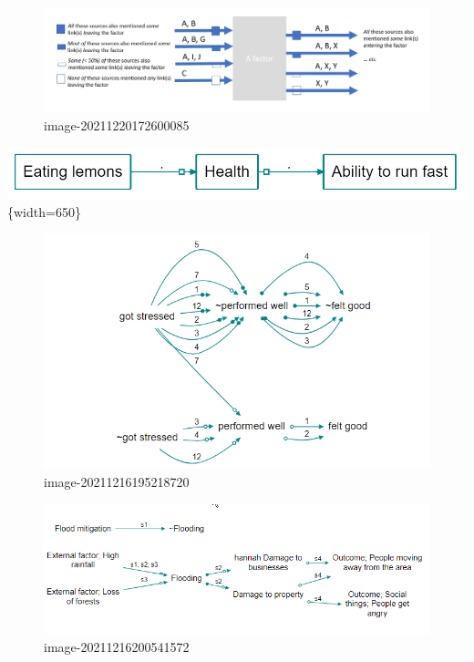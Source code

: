\documentclass[
]{book}
\begin{document}
\begin{figure}
\centering
\includegraphics[width=6.77083in,height=\textheight]{_assets/image-20211220172600085.png}
\caption{image-20211220172600085}
\end{figure}

\includegraphics[width=6.77083in,height=\textheight]{_assets/image-20211220171759409.png}\{width=650\}

\begin{figure}
\centering
\includegraphics[width=6.77083in,height=\textheight]{_assets/image-20211216195218720.png}
\caption{image-20211216195218720}
\end{figure}

\begin{figure}
\centering
\includegraphics[width=6.77083in,height=\textheight]{_assets/image-20211216200541572.png}
\caption{image-20211216200541572}
\end{figure}
\end{document}
